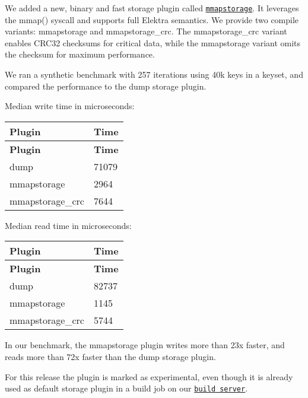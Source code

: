 We added a new, binary and fast storage plugin called \href{https://libelektra.org/plugins/mmapstorage}{\tt {\ttfamily mmapstorage}}. It leverages the {\ttfamily mmap()} syscall and supports full Elektra semantics. We provide two compile variants\+: {\ttfamily mmapstorage} and {\ttfamily mmapstorage\+\_\+crc}. The {\ttfamily mmapstorage\+\_\+crc} variant enables C\+R\+C32 checksums for critical data, while the {\ttfamily mmapstorage} variant omits the checksum for maximum performance.

We ran a synthetic benchmark with 257 iterations using 40k keys in a keyset, and compared the performance to the {\ttfamily dump} storage plugin.

Median write time in microseconds\+:

\tabulinesep=1mm
\begin{longtabu} spread 0pt [c]{*{2}{|X[-1]}|}
\hline
\rowcolor{\tableheadbgcolor}\textbf{ Plugin }&\textbf{ Time  }\\
\endfirsthead
\hline
\endfoot
\hline
\rowcolor{\tableheadbgcolor}\textbf{ Plugin }&\textbf{ Time  }\\
\endhead
{\ttfamily dump} &71079 \\
{\ttfamily mmapstorage} &2964 \\
{\ttfamily mmapstorage\+\_\+crc} &7644 \\
\end{longtabu}
Median read time in microseconds\+:

\tabulinesep=1mm
\begin{longtabu} spread 0pt [c]{*{2}{|X[-1]}|}
\hline
\rowcolor{\tableheadbgcolor}\textbf{ Plugin }&\textbf{ Time  }\\
\endfirsthead
\hline
\endfoot
\hline
\rowcolor{\tableheadbgcolor}\textbf{ Plugin }&\textbf{ Time  }\\
\endhead
{\ttfamily dump} &82737 \\
{\ttfamily mmapstorage} &1145 \\
{\ttfamily mmapstorage\+\_\+crc} &5744 \\
\end{longtabu}
In our benchmark, the {\ttfamily mmapstorage} plugin writes more than 23x faster, and reads more than 72x faster than the {\ttfamily dump} storage plugin.

For this release the plugin is marked as experimental, even though it is already used as default storage plugin in a build job on our \href{https://build.libelektra.org}{\tt build server}.

